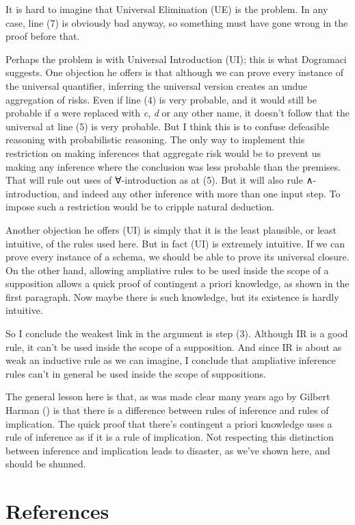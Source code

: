 \documentclass[
  11pt,
  letterpaper,
  DIV=11,
  numbers=noendperiod,
  twoside]{scrartcl}
\begin{document}
It is hard to imagine that Universal Elimination (UE) is the problem. In
any case, line (7) is obviously bad anyway, so something must have gone
wrong in the proof before that.

Perhaps the problem is with Universal Introduction (UI); this is what
Dogramaci suggests. One objection he offers is that although we can
prove every instance of the universal quantifier, inferring the
universal version creates an undue aggregation of risks. Even if line
(4) is very probable, and it would still be probable if \emph{a} were
replaced with \emph{c}, \emph{d} or any other name, it doesn't follow
that the universal at line (5) is very probable. But I think this is to
confuse defeasible reasoning with probabilistic reasoning. The only way
to implement this restriction on making inferences that aggregate risk
would be to prevent us making any inference where the conclusion was
less probable than the premises. That will rule out uses of
∀-introduction as at (5). But it will also rule ∧-introduction, and
indeed any other inference with more than one input step. To impose such
a restriction would be to cripple natural deduction.

Another objection he offers (UI) is simply that it is the least
plausible, or least intuitive, of the rules used here. But in fact (UI)
is extremely intuitive. If we can prove every instance of a schema, we
should be able to prove its universal closure. On the other hand,
allowing ampliative rules to be used inside the scope of a supposition
allows a quick proof of contingent a priori knowledge, as shown in the
first paragraph. Now maybe there is such knowledge, but its existence is
hardly intuitive.

So I conclude the weakest link in the argument is step (3). Although IR
is a good rule, it can't be used inside the scope of a supposition. And
since IR is about as weak an inductive rule as we can imagine, I
conclude that ampliative inference rules can't in general be used inside
the scope of suppositions.

The general lesson here is that, as was made clear many years ago by
Gilbert Harman () is that there is a
difference between rules of inference and rules of implication. The
quick proof that there's contingent a priori knowledge uses a rule of
inference as if it is a rule of implication. Not respecting this
distinction between inference and implication leads to disaster, as
we've shown here, and should be shunned.

\section*{References}\label{references}
\end{document}
